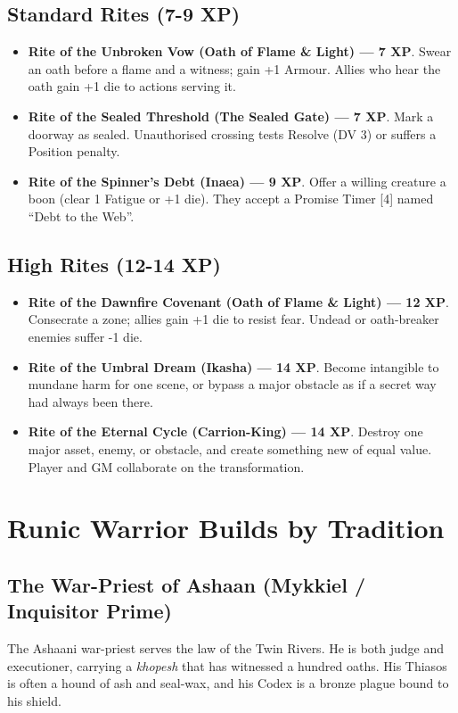 \documentclass[9pt,a5paper]{extbook}
\begin{document}
\subsection*{Standard Rites (7-9 XP)}
\begin{itemize}
    \item \textbf{Rite of the Unbroken Vow (Oath of Flame \& Light) --- 7 XP}. Swear an oath before a flame and a witness; gain +1 Armour. Allies who hear the oath gain +1 die to actions serving it.
    \item \textbf{Rite of the Sealed Threshold (The Sealed Gate) --- 7 XP}. Mark a doorway as sealed. Unauthorised crossing tests Resolve (DV 3) or suffers a Position penalty.
    \item \textbf{Rite of the Spinner's Debt (Inaea) --- 9 XP}. Offer a willing creature a boon (clear 1 Fatigue or +1 die). They accept a Promise Timer [4] named ``Debt to the Web''.
\end{itemize}

\subsection*{High Rites (12-14 XP)}
\begin{itemize}
    \item \textbf{Rite of the Dawnfire Covenant (Oath of Flame \& Light) --- 12 XP}. Consecrate a zone; allies gain +1 die to resist fear. Undead or oath-breaker enemies suffer -1 die.
    \item \textbf{Rite of the Umbral Dream (Ikasha) --- 14 XP}. Become intangible to mundane harm for one scene, or bypass a major obstacle as if a secret way had always been there.
    \item \textbf{Rite of the Eternal Cycle (Carrion-King) --- 14 XP}. Destroy one major asset, enemy, or obstacle, and create something new of equal value. Player and GM collaborate on the transformation.
\end{itemize}

\section{Runic Warrior Builds by Tradition}

\subsection{The War-Priest of Ashaan (Mykkiel / Inquisitor Prime)}

The Ashaani war-priest serves the law of the Twin Rivers. He is both judge and executioner, carrying a \textit{khopesh} that has witnessed a hundred oaths. His Thiasos is often a hound of ash and seal-wax, and his Codex is a bronze plague bound to his shield.
\end{document}
